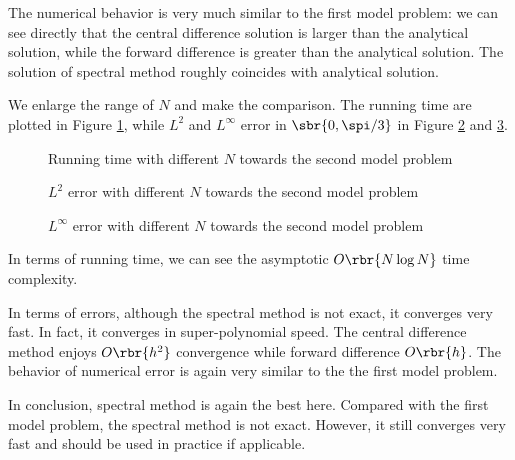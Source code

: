 \documentclass[english, nochinese]{pnote}
\begin{document}
The numerical behavior is very much similar to the first model problem: we can see directly that the central difference solution is larger than the analytical solution, while the forward difference is greater than the analytical solution. The solution of spectral method roughly coincides with analytical solution.

We enlarge the range of $N$ and make the comparison. The running time are plotted in Figure \ref{Fig:SecondTime}, while $L^2$ and $L^{\infty}$ error in $ \sbr{ 0, \spi / 3 } $ in Figure \ref{Fig:SecondL2} and \ref{Fig:SecondLInfty}.

\begin{figure}[htbp]
\centering

\caption{Running time with different $N$ towards the second model problem}
\label{Fig:SecondTime}
\end{figure}

\begin{figure}[htbp]
\centering

\caption{$L^2$ error with different $N$ towards the second model problem}
\label{Fig:SecondL2}
\end{figure}

\begin{figure}[htbp]
\centering

\caption{$L^{\infty}$ error with different $N$ towards the second model problem}
\label{Fig:SecondLInfty}
\end{figure}

In terms of running time, we can see the asymptotic $ O \rbr{ N \log N } $ time complexity.

In terms of errors, although the spectral method is not exact, it converges very fast. In fact, it converges in super-polynomial speed. The central difference method enjoys $ O \rbr{h^2} $ convergence while forward difference $ O \rbr{h} $. The behavior of numerical error is again very similar to the the first model problem.

In conclusion, spectral method is again the best here. Compared with the first model problem, the spectral method is not exact. However, it still converges very fast and should be used in practice if applicable.
\end{document}
